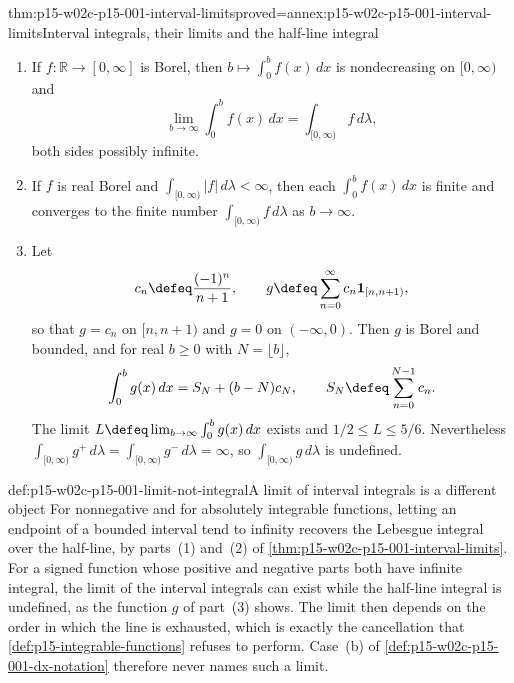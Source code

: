 \begin{hbtheorem}{thm:p15-w02c-p15-001-interval-limits}{proved=annex:p15-w02c-p15-001-interval-limits}{Interval integrals, their limits and the half-line integral}
\par\nobreak
\begin{enumerate}
\item If \(f:\mathbb R\to[0,\infty]\) is Borel, then
      \(b\mapsto\int_0^b f(x)\,dx\) is nondecreasing on \([0,\infty)\)
      and
      \[
       \lim_{b\to\infty}\int_0^b f(x)\,dx=\int_{[0,\infty)}f\,d\lambda,
      \]
      both sides possibly infinite.
\item If \(f\) is real Borel and \(\int_{[0,\infty)}|f|\,d\lambda<\infty\),
      then each \(\int_0^b f(x)\,dx\) is finite and converges to the finite
      number \(\int_{[0,\infty)}f\,d\lambda\) as \(b\to\infty\).
\item Let
      \[
       c_n\defeq\frac{(-1)^n}{n+1},\qquad
       g\defeq\sum_{n=0}^\infty c_n\mathbf1_{[n,n+1)},
      \]
      so that \(g=c_n\) on \([n,n+1)\) and \(g=0\) on \((-\infty,0)\).
      Then \(g\) is Borel and bounded, and for real \(b\geq0\) with
      \(N=\lfloor b\rfloor\),
      \[
       \int_0^b g(x)\,dx=S_N+(b-N)c_N,\qquad
       S_N\defeq\sum_{n=0}^{N-1}c_n .
      \]
      The limit \(L\defeq\lim_{b\to\infty}\int_0^b g(x)\,dx\) exists and
      \(1/2\leq L\leq5/6\). Nevertheless
      \(\int_{[0,\infty)}g^+\,d\lambda=\int_{[0,\infty)}g^-\,d\lambda=\infty\),
      so \(\int_{[0,\infty)}g\,d\lambda\) is undefined.
\end{enumerate}
\end{hbtheorem}

\begin{hbwarning}{def:p15-w02c-p15-001-limit-not-integral}{A limit of interval integrals is a different object}
For nonnegative and for absolutely integrable functions, letting an
endpoint of a bounded interval tend to infinity recovers the Lebesgue
integral over the half-line, by parts~(1) and~(2) of
\cref{thm:p15-w02c-p15-001-interval-limits}. For a signed function whose
positive and negative parts both have infinite integral, the limit of the
interval integrals can exist while the half-line integral is undefined, as
the function \(g\) of part~(3) shows. The limit then depends on the order
in which the line is exhausted, which is exactly the cancellation that
\cref{def:p15-integrable-functions} refuses to perform. Case~(b) of
\cref{def:p15-w02c-p15-001-dx-notation} therefore never names such a limit.
\end{hbwarning}

